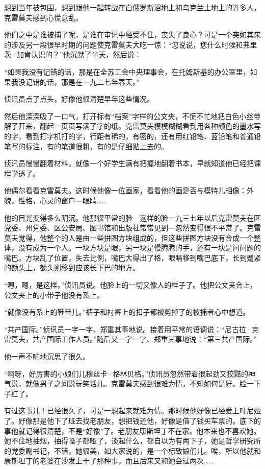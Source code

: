 想到当年被包围，想到跟他一起转战在白俄罗斯沼地上和乌克兰土地上的许多人，克雷莫夫感到心慌意乱。

他们之中是谁被捕了呢，是谁在审讯中经受不住，丧失了良心？可是一个突如其来的涉及另一段很早时期的问题使克雷莫夫大吃一惊：“您说说，您什么时候和弗里茨·加肯认识的？”他沉默了半天，然后说：

“如果我没有记错的话，那是在全苏工会中央理事会，在托姆斯基的办公室里，如果我没记错的话，那是在一九二七年春天。”

侦讯员点了点头，好像他很清楚早年这些情况。

然后他深深吸了一口气，打开标有“档案”字样的公文夹，不慌不忙地把白色小丝带解了开来，翻起一页页写满了字的纸。克雷莫夫模模糊糊看到用各种颜色的墨水写的字，看到打字机打的字，行距有稀的，有密的，还有用红铅笔、蓝铅笔和普通铅笔写的标注，有的笔道很粗，有的是仔细贴上去的。

侦讯员慢慢翻着材料，就像一个好学生满有把握地翻着书本，早就知道他已经把课程学透了。

他偶尔看看克雷莫夫。这时候他像一位画家，看看他的画是否与模特儿相像：外貌，性格，心灵的窗户—眼睛……

他的目光变得多么阴沉。他那很平常的脸—这样的脸一九三七年以后克雷莫夫在区党委、州党委、区公安局、图书馆和出版社常常见到—忽然变得很不平常了。克雷莫夫觉得，他整个的人是由一些拼图方块组成的，但这些拼图方块没有合成一个整体，没有成为一个人。一块方块是眼，另一块是慢腾腾的手，还有一块是问问题的嘴巴。方块乱了位置，失去比例，嘴巴大得出了格，眼睛移到嘴巴底下，长到蹙紧的额头上，额头则移到应该长下巴的地方。

“嗯，嗯，是这样。”侦讯员说。他脸上的一切又像人的样子了。他把公文夹合上，公文夹上的小带子他没有系上。

“就像没有系上的鞋带儿。”裤子和衬裤上的扣子都被剪掉了的被捕者心中想道。

“共产国际。”侦讯员一字一字、郑重其事地说。接着用平常的语调说：“尼古拉·克雷莫夫，共产国际工作人员。”随后又一字一字、郑重其事地说：“第三共产国际。”

他一声不响地沉思了很久。

“啊呀，好厉害的小娘们儿穆丝卡·格林贝格。”侦讯员忽然带着很起劲又狡黠的神气说，就像男子之间说玩笑话儿。克雷莫夫感到很难为情，不知如何是好。脸一下子红了。

有过这事儿！已经很久了，可是一想起来就难为情。那时候他好像已经爱上叶尼娅了。好像那是他下了班去找老朋友，想把钱还他，好像是借了钱买车票的。底下的事他就记得很清楚，不是“好像”了。老朋友康斯坦丁不在家。他本来也不喜欢她。她不住地抽烟，抽得嗓子都哑了，谈起什么，都自以为有两下子，她是哲学研究所的党委副书记，不错，她很美，如大家说的，是一个标致娘们儿。唉，所以他就和康斯坦丁的老婆在沙发上干了那种事，而且后来又和她会过两次……

